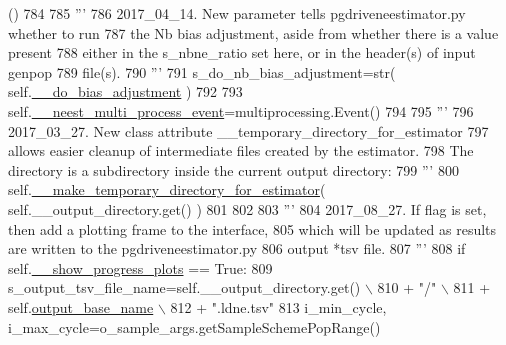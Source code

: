 \begin{DoxyCode}
      ()
784 
785         \textcolor{stringliteral}{'''}
786 \textcolor{stringliteral}{        2017\_04\_14. New parameter tells pgdriveneestimator.py whether to run}
787 \textcolor{stringliteral}{        the Nb bias adjustment, aside from whether there is a value present}
788 \textcolor{stringliteral}{        either in the s\_nbne\_ratio set here, or in  the header(s) of input genpop}
789 \textcolor{stringliteral}{        file(s).}
790 \textcolor{stringliteral}{        '''}
791         s\_do\_nb\_bias\_adjustment=str( self.\hyperlink{classnegui_1_1pgguineestimator__experimental_1_1PGGuiNeEstimator_aec040e3496b5833ae365fbbb4ee94e65}{\_\_do\_bias\_adjustment} )
792 
793         self.\hyperlink{classnegui_1_1pgguineestimator__experimental_1_1PGGuiNeEstimator_ab0f0be0bc9d8f31b76a0e8e49cce6663}{\_\_neest\_multi\_process\_event}=multiprocessing.Event()
794 
795         \textcolor{stringliteral}{'''}
796 \textcolor{stringliteral}{        2017\_03\_27.  New class attribute \_\_temporary\_directory\_for\_estimator}
797 \textcolor{stringliteral}{        allows easier cleanup of intermediate files created by the estimator.}
798 \textcolor{stringliteral}{        The directory is a subdirectory inside the current output directory:}
799 \textcolor{stringliteral}{        '''}
800         self.\hyperlink{classnegui_1_1pgguineestimator__experimental_1_1PGGuiNeEstimator_a492ea584ff0f5c5e932bfb2a8451feca}{\_\_make\_temporary\_directory\_for\_estimator}( 
      self.\_\_output\_directory.get() )
801 
802 
803         \textcolor{stringliteral}{'''}
804 \textcolor{stringliteral}{        2017\_08\_27.  If flag is set, then add a plotting frame to the interface,}
805 \textcolor{stringliteral}{        which will be updated as results are written to the pgdriveneestimator.py}
806 \textcolor{stringliteral}{        output *tsv file.}
807 \textcolor{stringliteral}{        '''}
808         \textcolor{keywordflow}{if} self.\hyperlink{classnegui_1_1pgguineestimator__experimental_1_1PGGuiNeEstimator_a6eb55644b1ccacda24ba751800554726}{\_\_show\_progress\_plots} == \textcolor{keyword}{True}:
809             s\_output\_tsv\_file\_name=self.\_\_output\_directory.get() \(\backslash\)
810                                     + \textcolor{stringliteral}{"/"} \(\backslash\)
811                                     + self.\hyperlink{classnegui_1_1pgguineestimator__experimental_1_1PGGuiNeEstimator_aa99bb40c806d746401e2b59bbdc7d0a8}{output\_base\_name} \(\backslash\)
812                                     + \textcolor{stringliteral}{".ldne.tsv"}
813             i\_min\_cycle, i\_max\_cycle=o\_sample\_args.getSampleSchemePopRange()

\end{DoxyCode}
